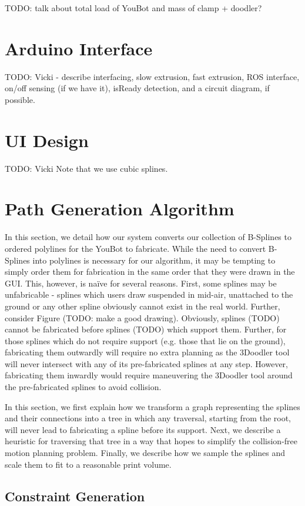 \documentclass[conference]{acmsiggraph}
\begin{document}
TODO: talk about total load of YouBot and mass of clamp + doodler?

\section{Arduino Interface}
TODO: Vicki - describe interfacing, slow extrusion, fast extrusion, ROS interface, on/off sensing (if we have it), isReady detection, and a circuit diagram, if possible.


\section{UI Design}
TODO: Vicki
Note that we use cubic splines.

\section{Path Generation Algorithm}
In this section, we detail how our system converts our collection of B-Splines to ordered polylines for the YouBot to fabricate.  While the need to convert B-Splines into polylines is necessary for our algorithm, it may be tempting to simply order them for fabrication in the same order that they were drawn in the GUI.  This, however, is naïve for several reasons.  First, some splines may be unfabricable - splines which users draw suspended in mid-air, unattached to the ground or any other spline obviously cannot exist in the real world.  Further, consider Figure (TODO: make a good drawing).  Obviously, splines (TODO) cannot be fabricated before splines (TODO) which support them.  Further, for those splines which do not require support (e.g. those that lie on the ground), fabricating them outwardly will require no extra planning as the 3Doodler tool will never intersect with any of its pre-fabricated splines at any step.  However, fabricating them inwardly would require maneuvering the 3Doodler tool around the pre-fabricated splines to avoid collision.

In this section, we first explain how we transform a graph representing the splines and their connections into a tree in which any traversal, starting from the root, will never lead to fabricating a spline before its support.  Next, we describe a heuristic for traversing that tree in a way that hopes to simplify the collision-free motion planning problem.  Finally, we describe how we sample the splines and scale them to fit to a reasonable print volume.

\subsection{Constraint Generation}
\end{document}
